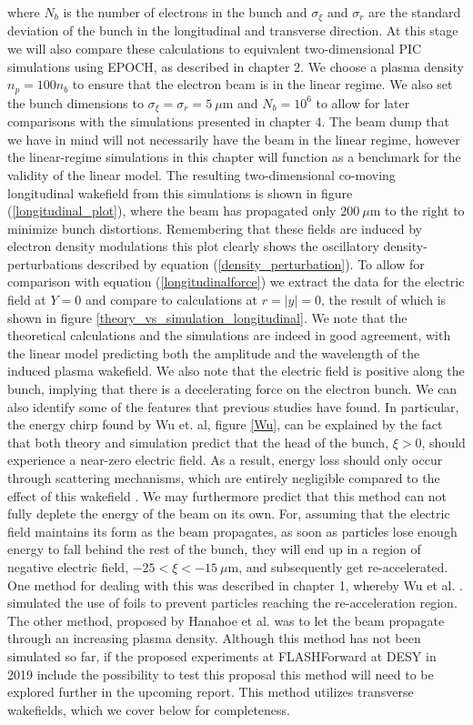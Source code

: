 where $N_b$ is the number of electrons in the bunch and $\sigma_{\xi}$ and $\sigma_r$ are the standard deviation of the bunch in the longitudinal and transverse direction. At this stage we will also compare these calculations to equivalent two-dimensional PIC simulations using EPOCH, as described in chapter 2.  We choose a plasma density $n_p=100n_b$ to ensure that the electron beam is in the linear regime. We also set the bunch dimensions to $\sigma_{\xi}=\sigma_r=5~\mu\text{m}$ and $N_b=10^6$ to allow for later comparisons with the simulations presented in chapter 4. The beam dump that we have in mind will not necessarily have the beam in the linear regime, however the linear-regime simulations in this chapter will function as a benchmark for the validity of the linear model. The resulting two-dimensional co-moving longitudinal wakefield from this simulations is shown in figure (\ref{longitudinal_plot}), where the beam has propagated only $200~\mu\text{m}$ to the right to minimize bunch distortions. Remembering that these fields are induced by electron density modulations this plot clearly shows the oscillatory density-perturbations described by equation (\ref{density_perturbation}). To allow for comparison with equation (\ref{longitudinalforce}) we extract the data for the electric field at $Y=0$ and compare to calculations at $r=|y|=0$, the result of which is shown in figure \ref{theory_vs_simulation_longitudinal}. We note that the theoretical calculations and the simulations are indeed in good agreement, with the linear model predicting both the amplitude and the wavelength of the induced plasma wakefield. We also note that the electric field is positive along the bunch, implying that there is a decelerating force on the electron bunch. We can also identify some of the features that previous studies have found. In particular, the energy chirp found by Wu et. al, figure \ref{Wu}, can be explained by the fact that both theory and simulation predict that the head of the bunch, $\xi>0$, should experience a near-zero electric field. As a result, energy loss should only occur through scattering mechanisms, which are entirely negligible compared to the effect of this wakefield \cite{Wu2010}. We may furthermore predict that this method can not fully deplete the energy of the beam on its own. For, assuming that the electric field maintains its form as the beam propagates, as soon as particles lose enough energy to fall behind the rest of the bunch, they will end up in a region of negative electric field, $-25<\xi<-15 ~\mu\text{m}$, and subsequently get re-accelerated. One method for dealing with this was described in chapter 1, whereby Wu et al. \cite{Wu2010}. simulated the use of foils to prevent particles reaching the re-acceleration region. The other method, proposed by Hanahoe et al. \cite{Hanahoe2017} was to let the beam propagate through an increasing plasma density. Although this method has not been simulated so far, if the proposed experiments at FLASHForward at DESY in 2019 include the possibility to test this proposal this method will need to be explored further in the upcoming report. This method utilizes transverse wakefields, which we cover below for completeness. 

